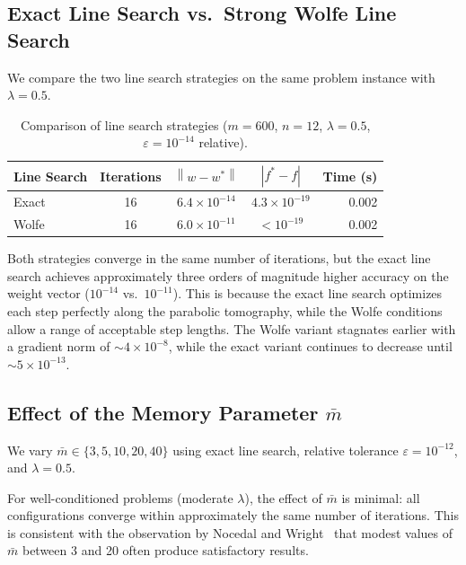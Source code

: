 \documentclass[11pt,a4paper]{article}
\newcommand{\norm}[1]{\left\|#1\right\|}
\begin{document}
\subsection{Exact Line Search vs.\ Strong Wolfe Line Search}
\label{sec:exact_vs_wolfe}

We compare the two line search strategies on the same problem instance with $\lambda = 0.5$.

\begin{table}[h]
\centering
\caption{Comparison of line search strategies ($m=600$, $n=12$, $\lambda=0.5$, $\varepsilon=10^{-14}$ relative).}
\label{tab:ls_comparison}
\begin{tabular}{lcccr}
    \toprule
    \textbf{Line Search} & \textbf{Iterations} & $\norm{w - w^*}$ & $|f^* - f|$ & \textbf{Time (s)} \\
    \midrule
    Exact   & 16 & $6.4 \times 10^{-14}$ & $4.3 \times 10^{-19}$ & 0.002 \\
    Wolfe   & 16 & $6.0 \times 10^{-11}$ & $< 10^{-19}$ & 0.002 \\
    \bottomrule
\end{tabular}
\end{table}

Both strategies converge in the same number of iterations, but the exact line search 
achieves approximately three orders of magnitude higher accuracy on the weight vector 
($10^{-14}$ vs.\ $10^{-11}$). This is because the exact line search optimizes each step 
perfectly along the parabolic tomography, while the Wolfe conditions allow a range of 
acceptable step lengths. The Wolfe variant stagnates earlier with a gradient norm 
of $\sim\!4 \times 10^{-8}$, while the exact variant continues to decrease until 
$\sim\!5 \times 10^{-13}$.



\subsection{Effect of the Memory Parameter $\bar{m}$}
\label{sec:memory_effect}

We vary $\bar{m} \in \{3, 5, 10, 20, 40\}$ using exact line search, relative tolerance 
$\varepsilon = 10^{-12}$, and $\lambda = 0.5$.

For well-conditioned problems (moderate $\lambda$), the effect of $\bar{m}$ is minimal: 
all configurations converge within approximately the same number of iterations. 
This is consistent with the observation by Nocedal and Wright~\cite[Section~9.1]{nocedal2006numerical} 
that modest values of $\bar{m}$ between 3 and 20 often produce satisfactory results.
\end{document}

